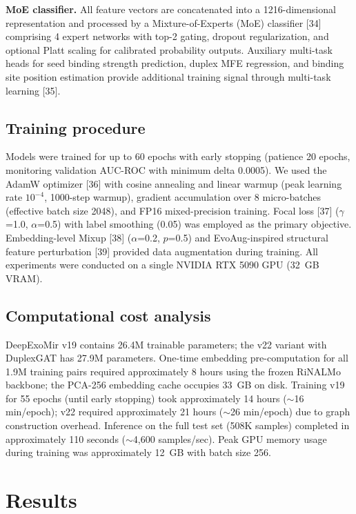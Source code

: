 \documentclass[sn-mathphys-num]{sn-jnl}
\begin{document}
\textbf{MoE classifier.} All feature vectors are concatenated into a 1216-dimensional representation and processed by a Mixture-of-Experts (MoE) classifier [34] comprising 4 expert networks with top-2 gating, dropout regularization, and optional Platt scaling for calibrated probability outputs. Auxiliary multi-task heads for seed binding strength prediction, duplex MFE regression, and binding site position estimation provide additional training signal through multi-task learning [35].

\subsection{Training procedure}

Models were trained for up to 60 epochs with early stopping (patience 20 epochs, monitoring validation AUC-ROC with minimum delta 0.0005). We used the AdamW optimizer [36] with cosine annealing and linear warmup (peak learning rate $10^{-4}$, 1000-step warmup), gradient accumulation over 8 micro-batches (effective batch size 2048), and FP16 mixed-precision training. Focal loss [37] ($\gamma$=1.0, $\alpha$=0.5) with label smoothing (0.05) was employed as the primary objective. Embedding-level Mixup [38] ($\alpha$=0.2, $p$=0.5) and EvoAug-inspired structural feature perturbation [39] provided data augmentation during training. All experiments were conducted on a single NVIDIA RTX 5090 GPU (32~GB VRAM).

\subsection{Computational cost analysis}

DeepExoMir v19 contains 26.4M trainable parameters; the v22 variant with DuplexGAT has 27.9M parameters. One-time embedding pre-computation for all 1.9M training pairs required approximately 8 hours using the frozen RiNALMo backbone; the PCA-256 embedding cache occupies 33~GB on disk. Training v19 for 55 epochs (until early stopping) took approximately 14 hours ($\sim$16 min/epoch); v22 required approximately 21 hours ($\sim$26 min/epoch) due to graph construction overhead. Inference on the full test set (508K samples) completed in approximately 110 seconds ($\sim$4,600 samples/sec). Peak GPU memory usage during training was approximately 12~GB with batch size 256.


\section{Results}\label{sec:results}
\end{document}
